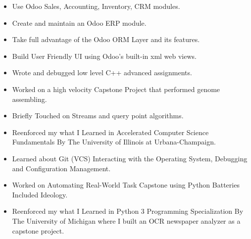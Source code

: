 \documentclass[10pt,a4paper,ragged2e,withhyper]{altacv}
\begin{document}
\begin{paracol}{2}


   \begin{itemize}
      \item Use Odoo Sales, Accounting, Inventory, CRM modules.
      \item Create and maintain an Odoo ERP module.
      \item Take full advantage of the Odoo ORM Layer and its features.
      \item Build User Friendly UI using Odoo's built-in xml web views.
   \end{itemize}

   \divider

   \begin{itemize}
      \item Wrote and debugged low level C++ advanced assignments.
      \item Worked on a high velocity Capstone Project that performed genome assembling.
      \item Briefly Touched on Streams and query point algorithms.
      \item Reenforced my what I Learned in Accelerated Computer Science Fundamentals By The University of Illinois at Urbana-Champaign.
   \end{itemize}

   \divider

   \begin{itemize}
      \item Learned about Git (VCS) Interacting with the Operating System, Debugging and Configuration Management.
      \item Worked on Automating Real-World Task Capstone using Python Batteries Included Ideology.
      \item Reenforced my what I Learned in Python 3 Programming Specialization By The University of Michigan where I built an OCR newspaper analyzer as a capstone project.
   \end{itemize}
   \divider



\end{paracol}
\end{document}
